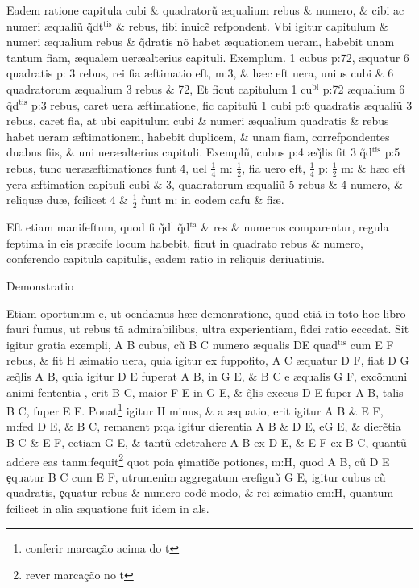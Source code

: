  Eadem ratione capitula cubi \& quadrator\~{u} {\ae}qualium rebus \& numero, \& cibi ac numeri {\ae}quali\~{u} \~{q}dt\( ^{\text{tis}} \) \& rebus, fibi inuic\~{e} refpondent. Vbi igitur capitulum \& numeri {\ae}qualium rebus \& \~{q}dratis n\~{o} habet {\ae}quationem ueram, habebit unam tantum fi{\ct}am, {\ae}qualem uer\ae alterius capituli. Exemplum. 1 cubus p:72, {\ae}quatur 6 quadratis p: 3 rebus, rei fi{\ct}a {\ae}ftimatio eft, m:3, \& h{\ae}c eft uera, unius cubi \& 6 quadratorum {\ae}qualium 3 rebus \& 72, Et ficut capitulum 1 cu\( ^{\text{bi}} \) p:72 {\ae}qualium 6 \~{q}d\( ^{\text{tis}} \) p:3 rebus, caret uera {\ae}ftimatione, fic capitul\~{u} 1 cubi p:6 quadratis {\ae}quali\~{u} 3 rebus, caret fi{\ct}a, at ubi capitulum cubi \& numeri {\ae}qualium quadratis \& rebus habet ueram {\ae}ftimationem, habebit duplicem, \& unam fi{\ct}am, correfpondentes duabus fi{\ct}is, \& uni uer\ae alterius capituli. Exempl\~{u}, cubus p:4 {\ae}\~{q}lis fit 3 \~{q}d\( ^{\text{tis}} \) p:5 rebus, tunc uer\ae {\ae}ftimationes funt 4, uel  \( \tfrac{1}{4} \) m: \( \tfrac{1}{2} \), fi{\ct}a uero eft,  \( \tfrac{1}{4} \) p: \( \tfrac{1}{2} \) m: \& h{\ae}c eft yera {\ae}ftimation capituli cubi \& 3, quadratorum {\ae}quali\~{u} 5 rebus \& 4 numero, \& reliqu{\ae} du{\ae}, fcilicet 4 \&  \( \tfrac{1}{2} \) funt m: in codem cafu \& fi{\ct\ae}.

 Eft etiam manifeftum, quod fi \~{q}d\( ^{\text{'}} \) \~{q}d\( ^{\text{ta}} \) \& res \& numerus comparentur, regula feptima in eis pr{\ae}cife locum habebit, ficut in quadrato rebus \& numero, conferendo capitula capitulis, eadem ratio in reliquis deriuatiuis.

\begin{center}
Demonstratio
\end{center}

 Etiam oportunum e{\ft}, ut o{\ft}endamus h{\ae}c demon{\ft}ratione, quod eti\~{a} in toto hoc libro fa{\ct}uri fumus, ut rebus t\~{a} admirabilibus, ultra experientiam, fidei ratio eccedat. Sit igitur gratia exempli, A B cubus, c\~{u} B C numero {\ae}qualis DE quad\( ^{\text{tis}} \) cum E F rebus, \& fit H {\ae\ft}imatio uera, quia igitur ex fuppofito, A C {\ae}quatur D F, fiat D G {\ae}\~{q}lis A B, quia igitur D E fuperat A B, in G E, \& B C e{\ft} {\ae}qualis G F, exc\~{o}muni animi fententia , erit B C, maior F E in G E, \& \~{q}lis exce{\ff}us D E fuper A B, talis B C, fuper E F. Ponat\footnote{conferir marcação acima do t} igitur H minus, \& {\jfi\ct}a {\ae}quatio, erit igitur A B \& E F, m:fed D E, \& B C, remanent p:qa igitur di{\ff}erentia A B \& D E, e\ft G E, \& di{\ff}er\~{e}tia B C \& E F, e\ft  etiam G E, \& tant\~{u} e\ft detrahere A B ex D E, \& E F ex B C, quant\~{u} addere eas tan\que m:fequit\footnote{rever marcação no t} quot po{\ft}ia \c{e}{\ft}imati\~{o}e po{\jfi}tiones, m:H, quod A B, c\~{u} D E \c{e}quatur B C cum E F, utrum\que enim aggregatum e\ft refigu\~{u} G E, igitur cubus c\~{u} quadratis, \c{e}quatur rebus \& numero eod\~{e} modo, \& rei {\ae\ft}imatio e\ft m:H, quantum fcilicet in alia {\ae}quatione fuit idem in al{\nb}s.

